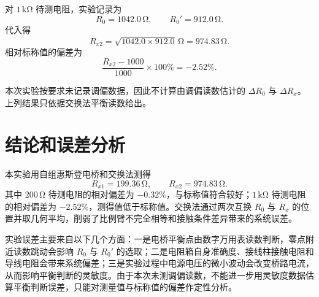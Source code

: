 \documentclass{../template/myrpt}
\begin{document}
对 $1\,\si{\kilo\ohm}$ 待测电阻，实验记录为
\[
  R_0=1042.0\,\si{\ohm},\qquad R_0'=912.0\,\si{\ohm}.
\]
代入得
\[
  R_{x2}=\sqrt{1042.0\times912.0}\,\si{\ohm}
  =974.83\,\si{\ohm}.
\]
相对标称值的偏差为
\[
  \frac{R_{x2}-1000}{1000}\times100\%=-2.52\%.
\]

本次实验按要求未记录调偏数据，因此不计算由调偏读数估计的 $\Delta R_0$ 与 $\Delta R_x$。上列结果只依据交换法平衡读数给出。

\section{结论和误差分析}

本实验用自组惠斯登电桥和交换法测得
\[
  R_{x1}=199.36\,\si{\ohm},\qquad
  R_{x2}=974.83\,\si{\ohm}.
\]
其中 $200\,\si{\ohm}$ 待测电阻的相对偏差为 $-0.32\%$，与标称值符合较好；$1\,\si{\kilo\ohm}$ 待测电阻的相对偏差为 $-2.52\%$，测得值低于标称值。交换法通过两次互换 $R_0$ 与 $R_x$ 的位置并取几何平均，削弱了比例臂不完全相等和接触条件差异带来的系统误差。

实验误差主要来自以下几个方面：一是电桥平衡点由数字万用表读数判断，零点附近读数跳动会影响 $R_0$ 与 $R_0'$ 的选取；二是电阻箱自身准确度、接线柱接触电阻和导线电阻会带来系统偏差；三是实验过程中电源电压的微小波动会改变桥路电流，从而影响平衡判断的灵敏度。由于本次未测调偏读数，不能进一步用灵敏度数据估算平衡判断误差，只能对测量值与标称值的偏差作定性分析。

\insertSignedDataPage
\end{document}
